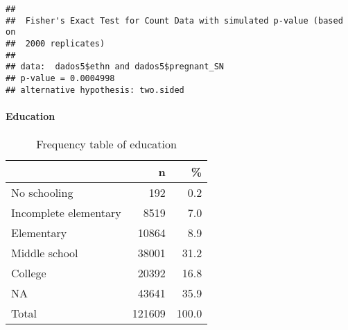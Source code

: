 \documentclass[
]{article}
\newenvironment{Shaded}{\begin{snugshade}}{\end{snugshade}}
\newcommand{\AttributeTok}[1]{\textcolor[rgb]{0.77,0.63,0.00}{#1}}
\newcommand{\ConstantTok}[1]{\textcolor[rgb]{0.00,0.00,0.00}{#1}}
\newcommand{\DecValTok}[1]{\textcolor[rgb]{0.00,0.00,0.81}{#1}}
\newcommand{\FunctionTok}[1]{\textcolor[rgb]{0.00,0.00,0.00}{#1}}
\newcommand{\NormalTok}[1]{#1}
\newcommand{\SpecialCharTok}[1]{\textcolor[rgb]{0.00,0.00,0.00}{#1}}
\newcommand{\StringTok}[1]{\textcolor[rgb]{0.31,0.60,0.02}{#1}}
\begin{document}
\begin{verbatim}
## 
##  Fisher's Exact Test for Count Data with simulated p-value (based on
##  2000 replicates)
## 
## data:  dados5$ethn and dados5$pregnant_SN
## p-value = 0.0004998
## alternative hypothesis: two.sided
\end{verbatim}

\hypertarget{education}{%
\paragraph{\texorpdfstring{{ Education
}}{ Education }}\label{education}}

\begin{Shaded}
\end{Shaded}

\begin{table}[H]

\caption{\label{tab:unnamed-chunk-30}Frequency table of education}
\centering
\begin{tabular}[t]{l|r|r}
\hline
  & n & \%\\
\hline
No schooling & 192 & 0.2\\
\hline
Incomplete elementary & 8519 & 7.0\\
\hline
Elementary & 10864 & 8.9\\
\hline
Middle school & 38001 & 31.2\\
\hline
College & 20392 & 16.8\\
\hline
NA & 43641 & 35.9\\
\hline
Total & 121609 & 100.0\\
\hline
\end{tabular}
\end{table}
\end{document}
